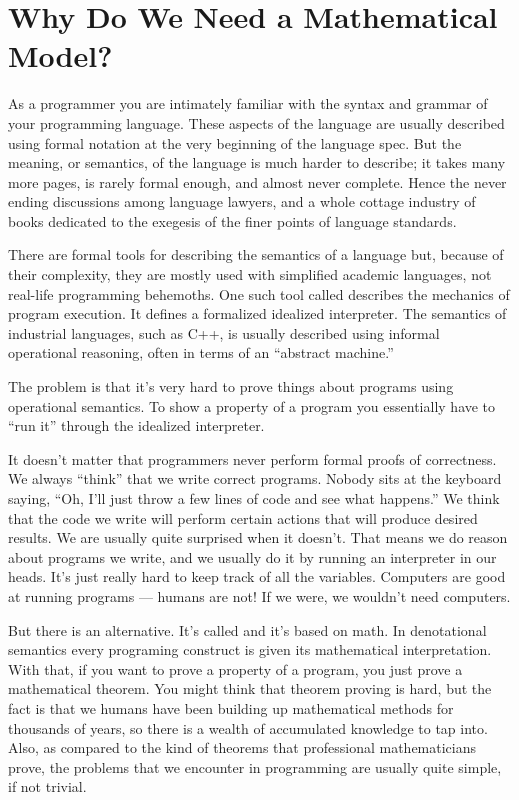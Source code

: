 \section{Why Do We Need a Mathematical
Model?}\label{why-do-we-need-a-mathematical-model}

As a programmer you are intimately familiar with the syntax and grammar
of your programming language. These aspects of the language are usually
described using formal notation at the very beginning of the language
spec. But the meaning, or semantics, of the language is much harder to
describe; it takes many more pages, is rarely formal enough, and almost
never complete. Hence the never ending discussions among language
lawyers, and a whole cottage industry of books dedicated to the exegesis
of the finer points of language standards.

There are formal tools for describing the semantics of a language but,
because of their complexity, they are mostly used with simplified
academic languages, not real-life programming behemoths. One such tool
called  describes the mechanics of program
execution. It defines a formalized idealized interpreter. The semantics
of industrial languages, such as C++, is usually described using
informal operational reasoning, often in terms of an ``abstract
machine.''

The problem is that it's very hard to prove things about programs using
operational semantics. To show a property of a program you essentially
have to ``run it'' through the idealized interpreter.

It doesn't matter that programmers never perform formal proofs of
correctness. We always ``think'' that we write correct programs. Nobody
sits at the keyboard saying, ``Oh, I'll just throw a few lines of code
and see what happens.'' We think that the code we write will perform
certain actions that will produce desired results. We are usually quite
surprised when it doesn't. That means we do reason about programs we
write, and we usually do it by running an interpreter in our heads. It's
just really hard to keep track of all the variables. Computers are good
at running programs --- humans are not! If we were, we wouldn't need
computers.

But there is an alternative. It's called 
and it's based on math. In denotational semantics every programing
construct is given its mathematical interpretation. With that, if you
want to prove a property of a program, you just prove a mathematical
theorem. You might think that theorem proving is hard, but the fact is
that we humans have been building up mathematical methods for thousands
of years, so there is a wealth of accumulated knowledge to tap into.
Also, as compared to the kind of theorems that professional
mathematicians prove, the problems that we encounter in programming are
usually quite simple, if not trivial.

